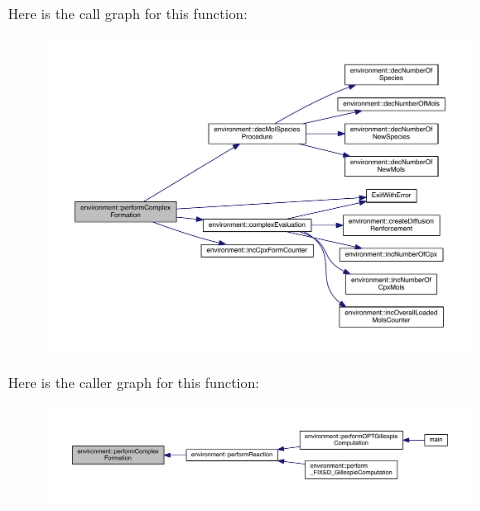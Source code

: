 Here is the call graph for this function\-:\nopagebreak
\begin{figure}[H]
\begin{center}
\leavevmode
\includegraphics[width=350pt]{a00014_aaf4f4f6be28edb182d2a2516c9394f9b_cgraph}
\end{center}
\end{figure}




Here is the caller graph for this function\-:\nopagebreak
\begin{figure}[H]
\begin{center}
\leavevmode
\includegraphics[width=350pt]{a00014_aaf4f4f6be28edb182d2a2516c9394f9b_icgraph}
\end{center}
\end{figure}


